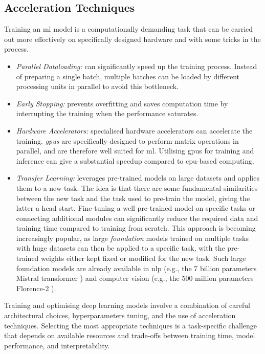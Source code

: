 \subsection{Acceleration Techniques}
Training an \gls{ml} model is a computationally demanding task that can be carried out more effectively on specifically designed hardware and with some tricks in the process. 
\begin{itemize}[leftmargin=*]
    \item \textit{Parallel Dataloading:} can significantly speed up the training process. Instead of preparing a single batch, multiple batches can be loaded by different processing units in parallel to avoid this bottleneck. 
    \item \textit{Early Stopping:} prevents overfitting and saves computation time by interrupting the training when the performance saturates.
    \item  \textit{Hardware Accelerators:} specialised hardware accelerators can accelerate the training. \textit{\glspl{gpu}} are specifically designed to perform matrix operations in parallel, and are therefore well suited for \gls{ml}. Utilising \glspl{gpu} for training and inference can give a substantial speedup compared to \gls{cpu}-based computing. 
    \item \textit{Transfer Learning:} leverages pre-trained models on large datasets and applies them to a new task. The idea is that there are some fundamental similarities between the new task and the task used to pre-train the model, giving the latter a head start. Fine-tuning a well pre-trained model on specific tasks or connecting additional modules can significantly reduce the required data and training time compared to training from scratch. This approach is becoming increasingly popular, as large \textit{foundation} models trained on multiple tasks with huge datasets can then be applied to a specific task, with the pre-trained weights either kept fixed or modified for the new task. Such large foundation models are already available in \gls{nlp} (e.g., the 7 billion parameters Mistral transformer \cite{jiang2023mistral}) and computer vision (e.g., the 500 million parameters Florence-2 \cite{xiao2023florence2}).
\end{itemize}
Training and optimising deep learning models involve a combination of careful architectural choices, hyperparameters tuning, and the use of acceleration techniques. Selecting the most appropriate techniques is a task-specific challenge that depends on available resources and trade-offs between training time, model performance, and interpretability.

